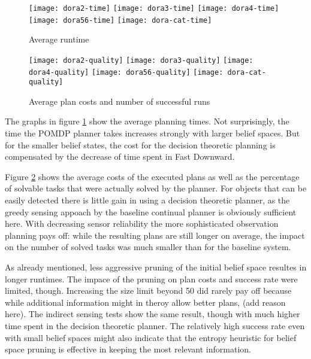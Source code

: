 \begin{figure}[h!]
  \texttt{[image: dora2-time]}\hfill
  \vspace{2mm}
  \texttt{[image: dora3-time]}\hfill
  \vspace{2mm}
  \texttt{[image: dora4-time]}\hfill
  \vspace{2mm}
  \texttt{[image: dora56-time]}\hfill
  \vspace{2mm}
  \texttt{[image: dora-cat-time]}\hfill
  \caption{Average runtime}
  \label{fig:results-time}
\end{figure}

\begin{figure}[h!]
  \texttt{[image: dora2-quality]}\hfill
  \vspace{2mm}
  \texttt{[image: dora3-quality]}\hfill
  \vspace{2mm}
  \texttt{[image: dora4-quality]}\hfill
  \vspace{2mm}
  \texttt{[image: dora56-quality]}\hfill
  \vspace{2mm}
  \texttt{[image: dora-cat-quality]}\hfill
  \caption{Average plan costs and number of successful runs}
  \label{fig:results-quality}
\end{figure}

The graphs in figure \ref{fig:results-time} show the average planning
times. Not surprisingly, the time the POMDP planner takes increases
strongly with larger belief spaces. But for the smaller belief states,
the cost for the decision theoretic planning is compensated by the
decrease of time spent in Fast Downward.

Figure \ref{fig:results-quality} shows the average costs of the
executed plans as well as the percentage of solvable tasks that were
actually solved by the planner. For objects that can be easily
detected there is little gain in using a decision theoretic planner,
as the greedy sensing appoach by the baseline continual planner is
obviously sufficient here. With decreasing sensor reliability the more
sophisticated observation planning pays off: while the resulting plans
are still longer on average, the impact on the number of solved tasks
was much smaller than for the baseline system.

As already mentioned, less aggressive pruning of the initial belief
space resultes in longer runtimes. The impace of the pruning on plan
costs and success rate were limited, though. Increasing the size limit
beyond 50 did rarely pay off because while additional information
might in theroy allow better plans, (add reason here). The indirect
sensing tests show the same result, though with much higher time spent
in the decision theoretic planner. The relatively high success rate
even with small belief spaces might also indicate that the entropy
heuristic for belief space pruning is effective in keeping the most
relevant information.


